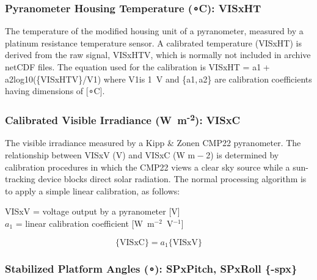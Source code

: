 \documentclass[
  english,
]{book}
\begin{document}
\hypertarget{visxht}{%
\subsubsection*{\texorpdfstring{Pyranometer Housing Temperature ({∘}C): VISxHT}{Pyranometer Housing Temperature (∘C): VISxHT}}\label{visxht}}

The temperature of the modified housing unit of a pyranometer, measured by a platinum resistance temperature sensor. A calibrated temperature (VISxHT) is derived from the raw signal, VISxHTV, which is normally not included in archive netCDF files. The equation used for the calibration is VISxHT = {a1 + a2log10}(\{VISxHTV\}/{V1}) where {V1}is 1~V and {\{a1, a2\}} are calibration coefficients having dimensions of {{[}{∘}C{]}}.

\hypertarget{visxc}{%
\subsubsection*{\texorpdfstring{Calibrated Visible Irradiance (W~m\textsuperscript{-2}): VISxC}{Calibrated Visible Irradiance (W~m-2): VISxC}}\label{visxc}}

The visible irradiance measured by a Kipp \& Zonen CMP22 pyranometer. The relationship between VISxV (V) and VISxC (W m{ − 2}) is determined by calibration procedures in which the CMP22 views a clear sky source while a sun-tracking device blocks direct solar radiation. The normal processing algorithm is to apply a simple linear calibration, as follows:

VISxV = voltage output by a pyranometer {[}V{]}\\
\(a_{1}\) = linear calibration coefficient {[}W~m\(^{-2}\)~V\(^{-1}\){]}

\begin{equation}
\mathrm{\{VISxC\}}=a_{1}\mathrm{\{VISxV\}}
\label{eq:VISxC}
\end{equation}

\hypertarget{stabilized-platform-angles-spxpitch-spxroll--spx}{%
\subsubsection{\texorpdfstring{Stabilized Platform Angles ({∘}): SPxPitch, SPxRoll \{-spx\}}{Stabilized Platform Angles (∘): SPxPitch, SPxRoll \{-spx\}}}\label{stabilized-platform-angles-spxpitch-spxroll--spx}}
\end{document}
